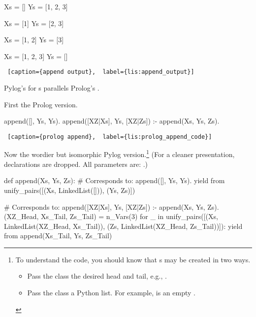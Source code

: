 \begin{itemize}
\begin{minipage}{\linewidth}  \largev \hrulefill
\begin{python}
Xs = []
Ys = [1, 2, 3]

Xs = [1]
Ys = [2, 3]

Xs = [1, 2]
Ys = [3]

Xs = [1, 2, 3]
Ys = []
\end{python}
\begin{lstlisting} [caption={append output},  label={lis:append_output}]
\end{lstlisting}
\end{minipage}
\smallv

Pylog's  for s parallels Prolog's .
\smallv

First the Prolog version.

\begin{minipage}{\linewidth}  \largev \hrulefill
\begin{python}
append([], Ys, Ys).
append([XZ|Xs], Ys, [XZ|Zs]) :- append(Xs, Ys, Zs).
\end{python}
\begin{lstlisting} [caption={prolog append},  label={lis:prolog_append_code}]
\end{lstlisting}
\end{minipage}
Now the wordier but isomorphic Pylog version.\footnote{To understand the code, you should know that s may be created in two ways.
\begin{itemize}
    \item Pass the  class the desired head and tail, e.g., \newline{}.
    \item Pass the   class a Python list. For example,
     is an empty . 
\end{itemize}
} (For a cleaner presentation, declarations are dropped. All parameters are: .)

\begin{minipage}{\linewidth}  \largev \hrulefill
\begin{python}
def append(Xs, Ys, Zs):
  # Corresponds to: append([], Ys, Ys).
  yield from unify_pairs([(Xs, LinkedList([])), (Ys, Zs)])

  # Corresponds to: append([XZ|Xs], Ys, [XZ|Zs]) :- append(Xs, Ys, Zs).
  (XZ_Head, Xs_Tail, Zs_Tail) = n_Vars(3)
  for _ in unify_pairs([(Xs, LinkedList(XZ_Head, Xs_Tail)),
                       (Zs, LinkedList(XZ_Head, Zs_Tail))]):
    yield from append(Xs_Tail, Ys, Zs_Tail)


\end{python}
\end{minipage}
\end{itemize}
